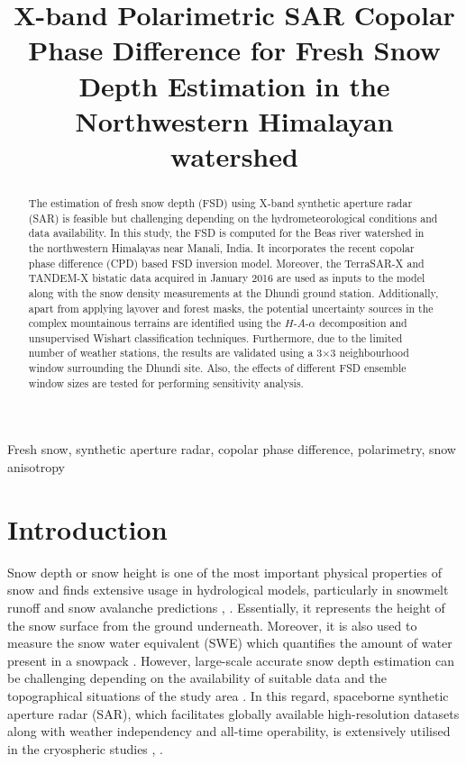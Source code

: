 \documentclass{article}
\title{X-band Polarimetric SAR Copolar Phase Difference for Fresh Snow Depth Estimation in the Northwestern Himalayan watershed}
\begin{document}
%
\maketitle
\begin{abstract}
The estimation of fresh snow depth (FSD) using X-band synthetic aperture radar (SAR) is feasible but challenging depending on the hydrometeorological conditions and data availability. In this study, the FSD is computed for the Beas river watershed in the northwestern Himalayas near Manali, India. It incorporates the recent copolar phase difference (CPD) based FSD inversion model. Moreover, the TerraSAR-X and TANDEM-X bistatic data acquired in January 2016 are used as inputs to the model along with the snow density measurements at the Dhundi ground station. Additionally, apart from applying layover and forest masks, the potential uncertainty sources in the complex mountainous terrains are identified using the $H$-$A$-$\alpha$ decomposition and unsupervised Wishart classification techniques. Furthermore, due to the limited number of weather stations, the results are validated using a 3$\times$3 neighbourhood window surrounding the Dhundi site. Also, the effects of different FSD ensemble window sizes are tested for performing sensitivity analysis.
\end{abstract}
%
\begin{keywords}
Fresh snow, synthetic aperture radar, copolar phase difference, polarimetry, snow anisotropy
\end{keywords}
%
\section{Introduction}
\label{sec:intro}
Snow depth or snow height is one of the most important physical properties of snow and finds extensive usage in hydrological models, particularly in snowmelt runoff and snow avalanche predictions \cite{Thakur2012}, \cite{Tedesco2015}. Essentially, it represents the height of the snow surface from the ground underneath. Moreover, it is also used to measure the snow water equivalent (SWE) which quantifies the amount of water present in a snowpack \cite{Tedesco2015}. However, large-scale accurate snow depth estimation can be challenging depending on the availability of suitable data and the topographical situations of the study area \cite{Leinss2014}. In this regard, spaceborne synthetic aperture radar (SAR), which facilitates globally available high-resolution datasets along with weather independency and all-time operability, is extensively utilised in the cryospheric studies \cite{Thakur2012}, \cite{Leinss2014}.
\end{document}
